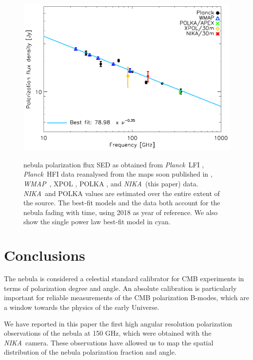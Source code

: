 \documentclass[twocolumn,traditabstract]{aa}
\def\NIKA{\textit{NIKA}}
\def\Planck{\textit{Planck}}
\def\WMAP{\textit{WMAP}}
\begin{document}
\begin{figure}
  \centering
             { \includegraphics[width=1\linewidth,keepaspectratio]{figures/Crab_SED_ipol.pdf}}
           \caption{ nebula polarization flux SED as obtained from \Planck\ LFI \citep{2015arXiv150702058P}, \Planck\ HFI data reanalysed from the maps soon published in \cite{planck2018}, \WMAP\ \citep{2011ApJS..192...19W}, XPOL \citep{aumont2010}, POLKA \citep{2014PASP..126.1027W}, and \NIKA\ (this paper) data. \NIKA\ and POLKA values are estimated over the entire extent of the source. The best-fit models and the data both account for the  nebula fading with time, using 2018 as year of reference. We also show the single power law best-fit model in cyan.}
\label{crab_SED_ipol}           
  \end{figure} 
 \noindent


\section{Conclusions}\label{sec:conclusions}
The  nebula is considered  a celestial standard calibrator for CMB experiments in
terms of polarization degree and angle. An absolute calibration is
particularly important for reliable measurements of the CMB polarization B-modes,
which are a window towards the physics of the early Universe.

We have reported in this paper the first high angular resolution polarization observations of the  nebula at 150 GHz, which were obtained with the \NIKA\ camera. These observations have
allowed us to map the spatial distribution of the  nebula polarization
fraction and angle.  
\end{document}
